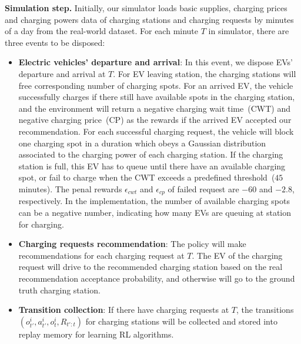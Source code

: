 \documentclass[sigconf]{acmart}
\begin{document}

\noindent \textbf{Simulation step.} Initially, our simulator loads basic supplies, charging prices and charging powers data of charging stations and charging requests by minutes of a day from the real-world dataset. For each minute $T$ in simulator, there are three events to be disposed:
\begin{itemize}
	\item \textbf{Electric vehicles' departure and arrival}: In this event, we dispose EVs' departure and arrival at $T$. For EV leaving station, the charging stations will free corresponding number of charging spots. For an arrived EV, the vehicle successfully charges if there still have available spots in the charging station, and the environment will return a negative charging wait time~(CWT) and negative charging price~(CP) as the rewards if the arrived EV accepted our recommendation.
	For each successful charging request, the vehicle will block one charging spot in a duration which obeys a Gaussian distribution associated to the charging power of each charging station.
	If the charging station is full, this EV has to queue until there have an available charging spot, or fail to charge when the CWT exceeds a predefined threshold~($45$ minutes). The penal rewards $\epsilon_{cwt}$ and $\epsilon_{cp}$ of failed request are $-60$ and $-2.8$, respectively.
	In the implementation, the number of available charging spots can be a negative number, indicating how many EVs are queuing at station for charging.
	
	\item \textbf{Charging requests recommendation}: The policy will make recommendations for each charging request at $T$. The EV of the charging request will drive to the recommended charging station based on the real recommendation acceptance probability, and otherwise will go to the ground truth charging station.
	
	\item \textbf{Transition collection}: If there have charging requests at $T$, the transitions $(o_{t'}^i,a_{t'}^i,o_{t}^i,R_{t':t})$ for charging stations will be collected and stored into replay memory \cite{mnih2015human} for learning RL algorithms.
\end{itemize}
\end{document}
